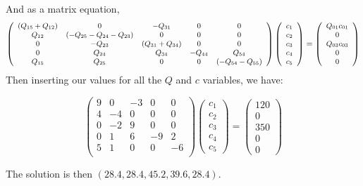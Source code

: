 \documentclass[12pt]{amsart}
\begin{document}
\begin{enumerate}
And as a matrix equation,
\[{\small \left(
\begin{array}{ccccc}
(Q_{15} + Q_{12})  & 0 &   - Q_{31} & 0  & 0 \\
Q_{12}   & (-Q_{25} - Q_{24} - Q_{23}) & 0 & 0 & 0  \\
0  & - Q_{23}  & (Q_{31} + Q_{34}) & 0 & 0   \\
0 & Q_{24}  & Q_{34}  & - Q_{44}  & Q_{54} \\
Q_{15}  & Q_{25} & 0 & 0 & (-Q_{54} - Q_{55}) \\
\end{array} \right)
\left(
\begin{array}{c}
c_1 \\ c_2 \\ c_3 \\ c_4 \\ c_5
\end{array}
\right) = 
\left( \begin{array}{c}
 Q_{01} c_{01} \\ 0  \\ Q_{03} c_{03} \\ 0 \\ 0
\end{array} \right)}
\]
Then inserting our values for all the $Q$ and $c$ variables, we have:

\[ \left(
\begin{array}{ccccc}
9 & 0 & -3 & 0 & 0 \\
4 & -4 & 0 & 0 & 0 \\
0 & -2 & 9 & 0 & 0 \\
0 & 1 & 6 & -9 & 2 \\
5 & 1 & 0 & 0 & -6 \\
\end{array}
\right)
\left(
\begin{array}{c}
c_1 \\ c_2 \\ c_3 \\ c_4 \\ c_5
\end{array}
\right) = 
\left( \begin{array}{c}
120 \\ 0  \\ 350 \\ 0 \\ 0
\end{array} \right)
\]
\end{enumerate}

The solution is then $(28.4,28.4,45.2,39.6,28.4)$.
\end{document}
